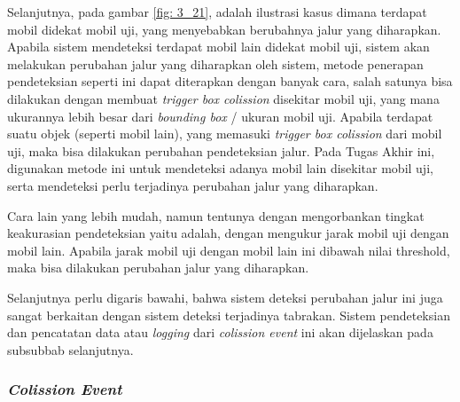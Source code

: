         \par Selanjutnya, pada gambar \ref{fig: 3_21}, adalah ilustrasi kasus dimana terdapat mobil didekat mobil uji, yang menyebabkan berubahnya jalur yang diharapkan. Apabila sistem mendeteksi terdapat mobil lain didekat mobil uji, sistem akan melakukan perubahan jalur yang diharapkan oleh sistem, metode penerapan pendeteksian seperti ini dapat diterapkan dengan banyak cara, salah satunya bisa dilakukan dengan membuat \textit{trigger box colission} disekitar mobil uji, yang mana ukurannya lebih besar dari \textit{bounding box} / ukuran mobil uji. Apabila terdapat suatu objek (seperti mobil lain), yang memasuki \textit{trigger box colission} dari mobil uji, maka bisa dilakukan perubahan pendeteksian jalur. Pada Tugas Akhir ini, digunakan metode ini untuk mendeteksi adanya mobil lain disekitar mobil uji, serta mendeteksi perlu terjadinya perubahan jalur yang diharapkan.
        
        \par Cara lain yang lebih mudah, namun tentunya dengan mengorbankan tingkat keakurasian pendeteksian yaitu adalah, dengan mengukur jarak mobil uji dengan mobil lain. Apabila jarak mobil uji dengan mobil lain ini dibawah nilai threshold, maka bisa dilakukan perubahan jalur yang diharapkan.
        
        \par Selanjutnya perlu digaris bawahi, bahwa sistem deteksi perubahan jalur ini juga sangat berkaitan dengan sistem deteksi terjadinya tabrakan. Sistem pendeteksian dan pencatatan data atau \textit{logging} dari \textit{colission event} ini akan dijelaskan pada subsubbab selanjutnya.
        
        \subsubsection{\textit{Colission Event}}
        
